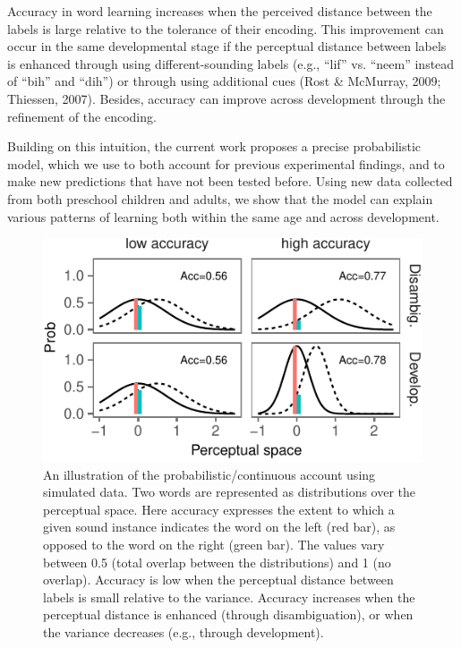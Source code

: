 \documentclass[10pt, letterpaper]{article}
\newenvironment{CodeChunk}{}{}
\begin{document}
Accuracy in word learning increases when the perceived distance between
the labels is large relative to the tolerance of their encoding. This
improvement can occur in the same developmental stage if the perceptual
distance between labels is enhanced through using different-sounding
labels (e.g., ``lif'' vs. ``neem'' instead of ``bih'' and ``dih'') or
through using additional cues (Rost \& McMurray, 2009; Thiessen, 2007).
Besides, accuracy can improve across development through the refinement
of the encoding.

Building on this intuition, the current work proposes a precise
probabilistic model, which we use to both account for previous
experimental findings, and to make new predictions that have not been
tested before. Using new data collected from both preschool children and
adults, we show that the model can explain various patterns of learning
both within the same age and across development.

\begin{CodeChunk}
\begin{figure}[H]

{\centering \includegraphics{figs/illus-1} 

}

\caption{\label{fig:illus} An illustration of the probabilistic/continuous account using simulated data. Two words are represented as distributions over the perceptual space. Here accuracy expresses the extent to which a given sound instance indicates the word on the left (red bar), as opposed to the word on the right (green bar). The values vary between 0.5 (total overlap between the distributions) and 1 (no overlap). Accuracy is low when the perceptual distance between labels is small relative to the variance. Accuracy increases when the perceptual distance is enhanced (through disambiguation), or when the variance decreases (e.g., through development).}\label{fig:illus}
\end{figure}
\end{CodeChunk}
\end{document}
